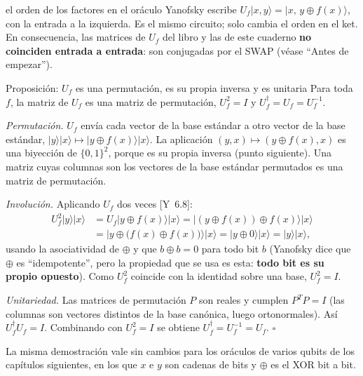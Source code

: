 \documentclass[11pt, a4paper, twoside, openright]{report}
\providecommand{\ket}[1]{|#1\rangle}
\newcommand{\Yan}[1]{\textcolor{rosaviejo}{\small[Y~#1]}}  %
\begin{document}
\begin{convencion}{el orden de los factores en el oráculo}
Yanofsky escribe $U_f\ket{x,y} = \ket{x,\,y\oplus f(x)}$, con la entrada a la izquierda. Es el mismo circuito; solo cambia el orden en el ket. En consecuencia, las matrices de $U_f$ del libro y las de este cuaderno \textbf{no coinciden entrada a entrada}: son conjugadas por el SWAP (véase ``Antes de empezar'').
\end{convencion}

\begin{teoria}{Proposición: $U_f$ es una permutación, es su propia inversa y es unitaria}
Para toda $f$, la matriz de $U_f$ es una matriz de permutación, $U_f^2 = I$ y $U_f^\dagger = U_f = U_f^{-1}$.
\end{teoria}

\begin{demo}
\textit{Permutación.} $U_f$ envía cada vector de la base estándar a otro vector de la base estándar, $\ket{y}\ket{x}\mapsto\ket{y\oplus f(x)}\ket{x}$. La aplicación $(y,x)\mapsto(y\oplus f(x), x)$ es una biyección de $\{0,1\}^2$, porque es su propia inversa (punto siguiente). Una matriz cuyas columnas son los vectores de la base estándar permutados es una matriz de permutación.

\textit{Involución.} Aplicando $U_f$ dos veces \Yan{6.8}:
\begin{align*} U_f^2\ket{y}\ket{x} &= U_f\ket{y\oplus f(x)}\ket{x} = \ket{(y\oplus f(x))\oplus f(x)}\ket{x} \\ &= \ket{y\oplus\big(f(x)\oplus f(x)\big)}\ket{x} = \ket{y\oplus 0}\ket{x} = \ket{y}\ket{x}, \end{align*}
usando la asociatividad de $\oplus$ y que $b\oplus b = 0$ para todo bit $b$ (Yanofsky dice que $\oplus$ es ``idempotente'', pero la propiedad que se usa es esta: \textbf{todo bit es su propio opuesto}). Como $U_f^2$ coincide con la identidad sobre una base, $U_f^2 = I$.

\textit{Unitariedad.} Las matrices de permutación $P$ son reales y cumplen $P^T P = I$ (las columnas son vectores distintos de la base canónica, luego ortonormales). Así $U_f^\dagger U_f = I$. Combinando con $U_f^2 = I$ se obtiene $U_f^\dagger = U_f^{-1} = U_f$. \hfill$\square$
\end{demo}

\noindent La misma demostración vale sin cambios para los oráculos de varios qubits de los capítulos siguientes, en los que $x$ e $y$ son cadenas de bits y $\oplus$ es el XOR bit a bit.
\end{document}
